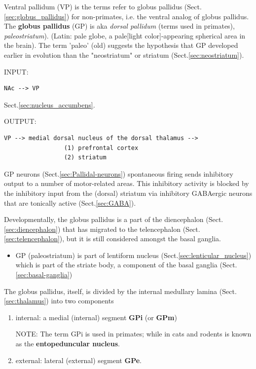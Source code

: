 Ventral pallidum (VP) is the terms refer to globus pallidus
(Sect.\ref{sec:globus_pallidus}) for non-primates, i.e. the ventral analog of
globus pallidus.
The {\bf globus pallidus} (GP) is aka {\it dorsal pallidum} (terms used in
primates), {\it paleostriatum}). (Latin: pale globe, a pale[light
color]-appearing spherical area in the brain). The term 'paleo' (old) suggests
the hypothesis that GP developed earlier in evolution than the "neostriatum" or
striatum (Sect.\ref{sec:neostriatum}).

INPUT:
\begin{verbatim}
NAc --> VP
\end{verbatim}
Sect.\ref{sec:nucleus_accumbens}.

OUTPUT:
\begin{verbatim}
VP --> medial dorsal nucleus of the dorsal thalamus --> 
                 (1) prefrontal cortex
                 (2) striatum 
\end{verbatim}


GP neurons (Sect.\ref{sec:Pallidal-neurons}) spontaneous firing sends inhibitory
output to a number of motor-related areas.
This inhibitory activity is blocked by the inhibitory input from the (dorsal)
striatum via inhibitory GABAergic neurons that are tonically active
(Sect.\ref{sec:GABA}).

Developmentally, the globus pallidus is a part of the diencephalon
(Sect.\ref{sec:diencephalon}) that has migrated to the telencephalon
(Sect.\ref{sec:telencephalon}), but it is still considered amongst the basal
ganglia.
\begin{itemize}
  \item GP (paleostriatum) is part of lentiform nucleus
  (Sect.\ref{sec:lenticular_nucleus}) which is part of the striate body, a
  component of the basal ganglia (Sect.\ref{sec:basal-ganglia})
\end{itemize}

The globus pallidus, itself, is divided by the internal medullary lamina
(Sect.\ref{sec:thalamus}) into two components
\begin{enumerate}
  \item internal: a medial (internal) segment {\bf GPi} (or {\bf GPm}) 

  NOTE: The term GPi is used in primates; while in cats and rodents is known as
  the {\bf entopeduncular nucleus}. 

  \item external: lateral (external) segment {\bf GPe}. 
  
\end{enumerate}

